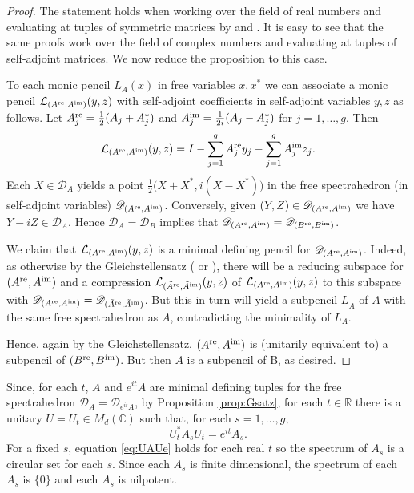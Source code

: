 \documentclass[12pt,makeidx]{amsart}
\def\beq{\begin{equation}}
\def\eeq{\end{equation}}
\newcommand{\pre}[1]{{#1}^{\rm re}}
\newcommand{\pim}[1]{{#1}^{\rm im}}
\numberwithin{equation}{section}
\def\cD{ {{\mathcal D}}}
\def\R{ {\mathbb{R}} }
\def\C{ {\mathbb{C}} }
\def\cD{ {\mathcal D} }
\def\cL{ {\mathcal L} }
\begin{document}
\def\cDD{\mathscr D}
\begin{proof}
The statement holds when working over the field of real numbers and evaluating at tuples of symmetric matrices
by \cite[Theorem 1.2]{HKM13} and \cite[Theorem 1.2]{Zal}.
It is easy to see that the same proofs work over the field
of complex numbers and evaluating at tuples of self-adjoint matrices. We now reduce the proposition to this case.

To each monic pencil $L_A(x)$ in free variables $x,x^*$ we can
associate a monic pencil $\cL_{(\pre A,\pim A)}(y,z)$ with
self-adjoint coefficients in self-adjoint variables 
$y,z$ as follows. Let $\pre A_j=\frac12(A_j+A_j^*)$ 
and $\pim A_j=\frac1{2i}(A_j-A_j^*)$ for $j=1,\ldots,g$.
Then
\[
\cL_{(\pre A,\pim A)}(y,z)= I - \sum_{j=1}^g \pre A_j y_j -
\sum_{j=1}^g \pim A_j z_j.
\]
Each $X\in\cD_A$ yields a point $\frac12 \big(X+X^*,i(X-X^*)\big)$
in the free spectrahedron  (in self-adjoint variables)
$\cDD_{(\pre A,\pim A)}$. Conversely, given
$(Y,Z)\in\cDD_{(\pre A,\pim A)}$ we have
$Y-iZ\in\cD_A$. Hence $\cD_A=\cD_B$  implies that
$\cDD_{(\pre A,\pim A)}=\cDD_{(\pre B,\pim B)}$.

We claim that $\cL_{(\pre A,\pim A)}(y,z)$
is a minimal defining pencil for
$\cDD_{(\pre A,\pim A)}$. Indeed, as otherwise 
by the Gleichstellensatz (\cite[Theorem 1.2]{HKM13} or \cite[Theorem 1.2]{Zal}), there will be 
a
reducing subspace for $(\pre A,\pim A)$ and a
compression 
$\cL_{(\pre {\tilde A},\pim {\tilde A})}(y,z)$
of $\cL_{(\pre A,\pim A)}(y,z)$
to this subspace 
with
$\cDD_{(\pre A,\pim A)}=\cDD_{(\pre {\tilde A},\pim {\tilde A})}$. But this in turn will 
 yield a subpencil 
$L_{\tilde A}$ of $A$ with the same free spectrahedron
as $A$, contradicting the minimality of $L_A$.

Hence, again by the Gleichstellensatz, $(\pre A,\pim A)$
is (unitarily equivalent to) a subpencil of
$(\pre B,\pim B)$. But then $A$ is a subpencil of B, as desired.
\end{proof}


 Since, for each $t$, $A$ and $e^{it}A$ are minimal defining tuples for the free spectrahedron $\cD_A=\cD_{e^{it}A}$, by Proposition \ref{prop:Gsatz}, for each $t\in\R$ there is a unitary $U=U_t \in M_d(\C)$ such that,
 for each $s= 1, \dots, g,$
  \beq
  \label{eq:UAUe}
  U_t^*A_s U_t =e^{it}A_s.
  \eeq
 For a fixed $s$, equation \eqref{eq:UAUe} holds for each real $t$ so the spectrum of $A_s$ is a circular set for each $s$. Since each $A_s$
  is finite dimensional, the spectrum of each $A_s$ is $\{0\}$ 
  and each $A_s$ is nilpotent. 
\end{document}
